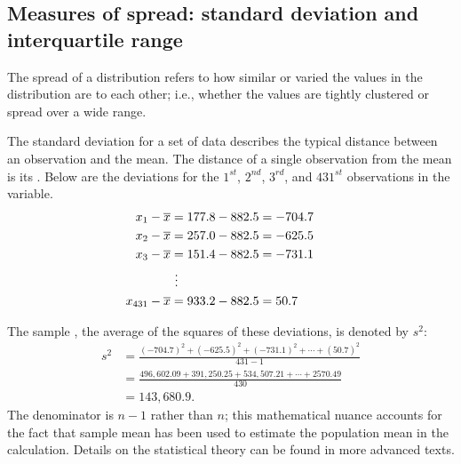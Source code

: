 \textD{\newpage}


\subsection{Measures of spread: standard deviation and interquartile range}
\label{measuresOfSpread}

The spread of a distribution refers to how similar or varied the values in the distribution are to each other; i.e., whether the values are tightly clustered or spread over a wide range.  

The standard deviation for a set of data describes the typical distance between an observation and the mean. The distance of a single observation from the mean is its . Below are the deviations for the $1^{st}$, $2^{nd}$, $3^{rd}$, and $431^{st}$ observations in the  variable.
\begin{align*}
x_1-\overline{x} &= 177.8 - 882.5 = -704.7 \hspace{5mm}\text{ } \\
x_2-\overline{x} &= 257.0 - 882.5 = -625.5 \\
x_3-\overline{x} &= 151.4 - 882.5 = -731.1 \\
&\ \vdots \\
x_{431}-\overline{x} &= 933.2 - 882.5 = 50.7
\end{align*}

The sample \label{varianceFirstDiscussed}, the average of the squares of these deviations, is denoted by $s^2$:
\begin{align*}
s^2 &= \frac{(-704.7)^2 + (-625.5)^2 + (-731.1)^2 + \cdots + (50.7)^2}{431-1} \\
&= \frac{496,602.09 + 391,250.25 + 534,507.21 + \cdots + 2570.49}{430} \\
&= 143,680.9.
\end{align*}
The denominator is $n-1$ rather than $n$; this mathematical nuance accounts for the fact that sample mean has been used to estimate the population mean in the calculation. Details on the statistical theory can be found in more advanced texts. 

